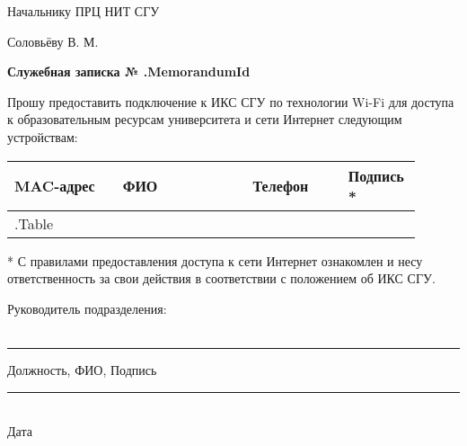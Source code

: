 \documentclass[12pt]{article}
\begin{document}
\begin{flushright}
Начальнику ПРЦ НИТ СГУ

Соловьёву В. М. \\[50pt]
\end{flushright}

\begin{center}
\large
\textbf{Служебная записка № {{.MemorandumId}} } \\[20pt]
\end{center}
\begin{flushleft}
\large
Прошу предоставить подключение к ИКС СГУ по технологии Wi-Fi для доступа к образовательным ресурсам университета и сети Интернет следующим устройствам:
\end{flushleft}




\begin{table}[!h]
\large
\centering
\label{my-label}
\begin{tabular}{|p{0.25\linewidth}|p{0.3\linewidth}|p{0.22\linewidth}|p{0.135\linewidth}|}
\hline
MAC-адрес & ФИО & Телефон & Подпись *  \\
\hline
{{.Table}}
\end{tabular}
\end{table}


\small
* С правилами предоставления доступа к сети Интернет ознакомлен и несу ответственность за свои действия в соответствии с положением об ИКС СГУ. \\[30pt]
\normalsize
\begin{flushleft}
\large
Руководитель подразделения:\\~\\
\end{flushleft}
\centering
\noindent\rule{550pt}{0.4pt}
\large
Должность, ФИО, Подпись\\[50pt]

\begin{flushright}
\normalsize
  \noindent\rule{100pt}{0.4pt} \\
  Дата           
\end{flushright}
\end{document}
